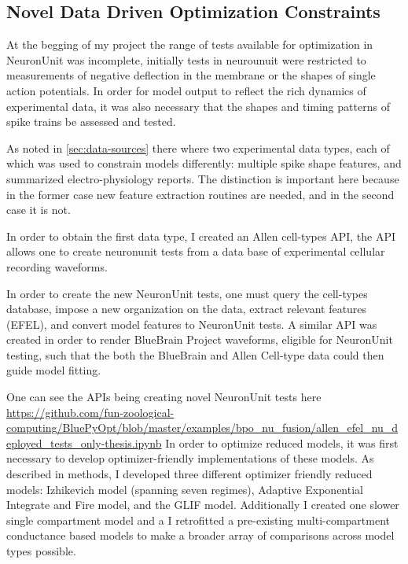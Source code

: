 \subsection{Novel Data Driven Optimization Constraints}

At the begging of my project the range of tests available for optimization in NeuronUnit was incomplete, initially tests in neurounuit were restricted to measurements of negative deflection in the membrane or the shapes of single action potentials. In order for model output to reflect the rich dynamics of experimental data, it was also necessary that the shapes and timing patterns of spike trains be assessed and tested. 

As noted in \ref{sec:data-sources} there where two experimental data types, each of which was used to constrain models differently: multiple spike shape features, and summarized electro-physiology reports. The distinction is important here because in the former case new feature extraction routines are needed, and in the second case it is not.

In order to obtain the first data type, I created an Allen cell-types API, the API allows one to create neuronunit tests from a data base of experimental cellular recording waveforms.

In order to create the new NeuronUnit tests, one must query the cell-types database, impose a new organization on the data, extract relevant features (EFEL), and convert model features to NeuronUnit tests. A similar API was created in order to render BlueBrain Project waveforms, eligible for NeuronUnit testing, such that the both the BlueBrain \cite{toledo} and Allen Cell-type data could then guide model fitting. %

One can see the APIs being creating novel NeuronUnit tests here \url{https://github.com/fun-zoological-computing/BluePyOpt/blob/master/examples/bpo_nu_fusion/allen_efel_nu_deployed_tests_only-thesis.ipynb}
In order to optimize reduced models, it was first necessary to develop optimizer-friendly implementations of these models. As described in methods, I developed three different optimizer friendly reduced models: Izhikevich model (spanning seven regimes), Adaptive Exponential Integrate and Fire model, and the GLIF model. Additionally I created one slower single compartment model and a I retrofitted a pre-existing multi-compartment conductance based models to make a broader array of comparisons across model types possible.

